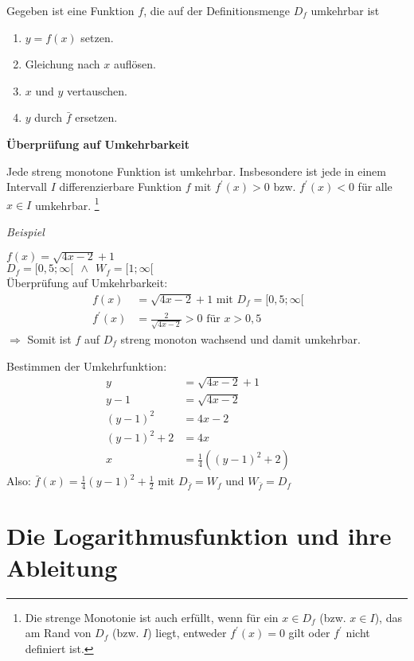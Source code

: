 Gegeben ist eine Funktion $f$, die auf der Definitionsmenge $D_f$ umkehrbar ist
\begin{enumerate}
    \item $y = f(x)$ setzen.
    \item Gleichung nach $x$ auflösen.
    \item $x$ und $y$ vertauschen. 
    \item $y$ durch $\bar{f}$ ersetzen.
\end{enumerate}

\textbf{Überprüfung auf Umkehrbarkeit}
\begin{satz}
    Jede streng monotone Funktion ist umkehrbar. Insbesondere ist jede in einem Intervall $I$ differenzierbare Funktion $f$ mit $f^\prime(x) > 0$ bzw. $f^\prime(x) < 0$ für alle $x \in I$ umkehrbar. \footnote{Die strenge Monotonie ist auch erfüllt, wenn für ein $x \in D_f$ (bzw. $x \in I$), das am Rand von $D_f$ (bzw. $I$) liegt, entweder $f^\prime(x) = 0$ gilt oder $f^\prime$ nicht definiert ist.}
\end{satz}

\textit{Beispiel}

$f(x) = \sqrt{4x-2} + 1$\\
$D_f = [0,5 ; \infty[ \ \ \land \ \ W_f = [1 ; \infty[$\\

Überprüfung auf Umkehrbarkeit:
\begin{align*}
    f(x) & = \sqrt{4x-2} + 1 \text{ mit } D_f = [0,5 ; \infty[ && \\
    f^\prime(x) & = \frac{2}{\sqrt{4x - 2}} > 0 \text{ für } x > 0,5 && 
\end{align*}
$\Rightarrow$ Somit ist $f$ auf $D_f$ streng monoton wachsend und damit umkehrbar.

Bestimmen der Umkehrfunktion:
\begin{align*}
    y & = \sqrt{4x-2} + 1 &&\\
    y -1 & = \sqrt{4x-2} &&\\
    (y-1)^2 & = 4x - 2 &&\\
    (y-1)^2 + 2 & = 4x &&\\
    x & = \frac{1}{4} ((y-1)^2 + 2) &&
\end{align*}
Also: $\bar{f}(x) = \frac{1}{4}(y-1)^2 + \frac{1}{2}$ mit $D_{\bar{f}}= W_f$ und $W_{\bar{f}}= D_f$

\section{Die Logarithmusfunktion und ihre Ableitung}

